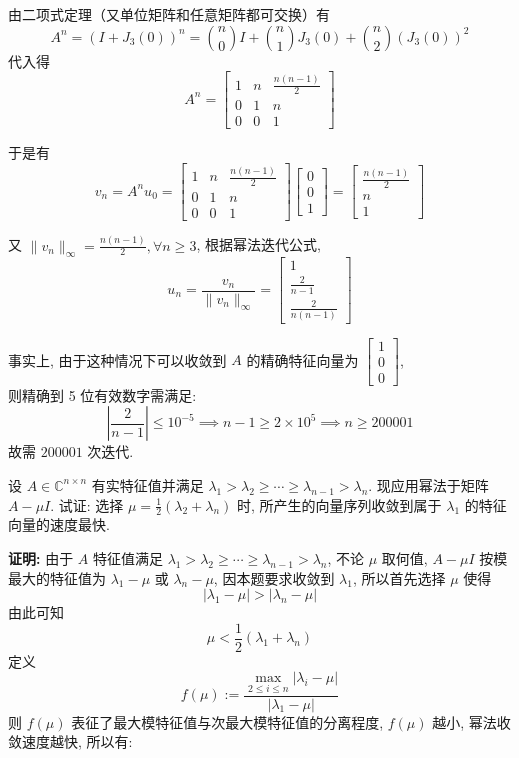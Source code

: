 \documentclass[12pt, answers]{exam}     %
\begin{document}
\begin{questions}
\begin{solution}
由二项式定理（又单位矩阵和任意矩阵都可交换）有
\[
A^n = (I + J_3(0))^n = \binom{n}{0} I + \binom{n}{1} J_3(0) + \binom{n}{2} (J_3(0))^2
\]
代入得
\[
A^n = \begin{bmatrix} 1 & n & \frac{n(n-1)}{2} \\ 0 & 1 & n \\ 0 & 0 & 1 \end{bmatrix}
\]

于是有
\[
v_n = A^n u_0 = \begin{bmatrix} 1 & n & \frac{n(n-1)}{2} \\ 0 & 1 & n \\ 0 & 0 & 1 \end{bmatrix} \begin{bmatrix} 0 \\ 0 \\ 1 \end{bmatrix} = \begin{bmatrix} \frac{n(n-1)}{2} \\ n \\ 1 \end{bmatrix}
\]

又 \( \| v_n \|_{\infty} =\frac{n(n-1)}{2}, \forall n \ge 3 \), 根据幂法迭代公式, 
\[
u_n = \frac{v_n}{\| v_n \|_{\infty}} = \begin{bmatrix} 1 \\ \frac{2}{n-1} \\ \frac{2}{n(n-1)} \end{bmatrix}
\]

事实上, 由于这种情况下可以收敛到 $ A $ 的精确特征向量为 \( \begin{bmatrix} 1 \\ 0 \\ 0 \end{bmatrix} \), \\
则精确到 5 位有效数字需满足: \\
\[
\left| \dfrac{2}{n-1} \right| \leq 10^{-5} \implies n-1 \geq 2 \times 10^5 \implies n \geq 200001
\]
故需 \( \boxed{200001} \) 次迭代. 
\end{solution}


\question{}设 \( A \in \mathbb{C}^{n \times n} \) 有实特征值并满足 \(\lambda_1 > \lambda_2 \geq \cdots \geq \lambda_{n-1} > \lambda_n\). 现应用幂法于矩阵 \(A - \mu I\). 试证: 选择 \(\mu = \frac{1}{2}(\lambda_2 + \lambda_n)\) 时, 所产生的向量序列收敛到属于 \(\lambda_1\) 的特征向量的速度最快. 

\begin{solution}
\textbf{证明:} 由于 \(A\) 特征值满足 \(\lambda_1 > \lambda_2 \geq \cdots \geq \lambda_{n-1} > \lambda_n\), 不论 \(\mu\) 取何值, \(A - \mu I\) 按模最大的特征值为 \(\lambda_1 - \mu\) 或 \(\lambda_n - \mu\), 因本题要求收敛到 \(\lambda_1\), 所以首先选择 \(\mu\) 使得
\[
|\lambda_1 - \mu| > |\lambda_n - \mu|
\]
由此可知
\[
\mu < \frac{1}{2}(\lambda_1 + \lambda_n)
\]
定义
\[
f(\mu) := \frac{\max\limits_{2 \leq i \leq n} |\lambda_i - \mu|}{|\lambda_1 - \mu|}
\]
则 \(f(\mu)\) 表征了最大模特征值与次最大模特征值的分离程度, \(f(\mu)\) 越小, 幂法收敛速度越快, 所以有: 


\end{solution}
\end{questions}
\end{document}
